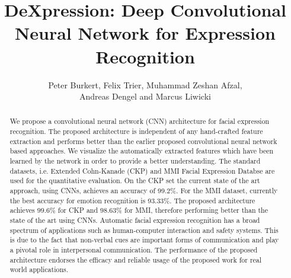 \documentclass[10pt,journal,compsoc, hidelinks]{IEEEtran}
\begin{document}
\title{DeXpression: Deep Convolutional Neural Network for Expression Recognition}






\author{

Peter Burkert,
Felix Trier,
Muhammad Zeshan Afzal,

Andreas Dengel and 
Marcus Liwicki




}


 
\maketitle



\begin{abstract}

We propose a convolutional neural network (CNN) architecture for facial expression recognition. The proposed architecture is independent of any hand-crafted feature extraction and performs better than the earlier proposed convolutional neural network based approaches. We visualize the automatically extracted features which have been learned by the network in order to provide a better understanding. The standard datasets, i.e. Extended Cohn-Kanade (CKP) and MMI Facial Expression Databse are used for the quantitative evaluation. On the CKP set the current state of the art approach, using CNNs, achieves an accuracy of 99.2\%. For the MMI dataset, currently the best accuracy for emotion recognition is 93.33\%. The proposed architecture achieves $99.6$\% for CKP and $98.63$\% for MMI, therefore performing better than the state of the art using CNNs. Automatic facial expression recognition has a broad spectrum of applications such as human-computer interaction and safety systems. This is due to the fact that non-verbal cues are important forms of communication and play a pivotal role in interpersonal communication. The performance of the proposed architecture endorses the efficacy and reliable usage of the proposed work for real world applications.

\end{abstract} 
\end{document}

